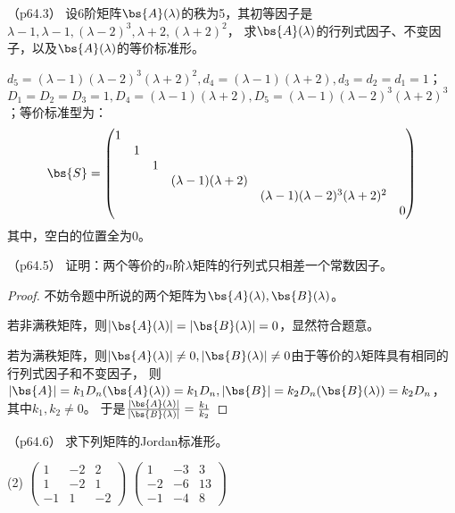 \documentclass[12pt, a4paper, oneside, UTF8]{ctexbook}
\begin{document}
\begin{question}（p64.3）
    设6阶矩阵$\bs{A}(\lambda)$的秩为5，其初等因子是$\lambda-1,\lambda-1,(\lambda-2)^3,\lambda+2,(\lambda+2)^2$，
    求$\bs{A}(\lambda)$的行列式因子、不变因子，以及$\bs{A}(\lambda)$的等价标准形。
\end{question}


\begin{solution}
    $d_5=(\lambda-1)(\lambda-2)^3(\lambda+2)^2,d_4=(\lambda-1)(\lambda+2),d_3=d_2=d_1=1$；
    $D_1=D_2=D_3=1,D_4=(\lambda-1)(\lambda+2),D_5=(\lambda-1)(\lambda-2)^3(\lambda+2)^3$；等价标准型为：
    \begin{align*}
        \bs{S}=\begin{pmatrix}
            1 & & & & & \\
            & 1 & & & &\\
            & & 1 & & &\\
            & & & (\lambda-1)(\lambda+2) & &\\
            & & & & (\lambda-1)(\lambda-2)^3(\lambda+2)^2 &\\
            & & & & & 0 \\
        \end{pmatrix}
    \end{align*}
    其中，空白的位置全为0。
\end{solution}

\begin{question}（p64.5）
    证明：两个等价的$n$阶$\lambda$矩阵的行列式只相差一个常数因子。
\end{question}

\begin{proof}
    不妨令题中所说的两个矩阵为$\bs{A}(\lambda),\bs{B}(\lambda)$。

    若非满秩矩阵，则$|\bs{A}(\lambda)|=|\bs{B}(\lambda)|=0$，显然符合题意。

    若为满秩矩阵，则$|\bs{A}(\lambda)| \neq 0,|\bs{B}(\lambda)| \neq 0$由于等价的$\lambda$矩阵具有相同的行列式因子和不变因子，
    则$|\bs{A}|=k_1D_n(\bs{A}(\lambda))=k_1D_n,|\bs{B}|=k_2D_n(\bs{B}(\lambda))=k_2D_n$，其中$k_1,k_2 \neq 0$。
    于是$\frac{|\bs{A}(\lambda)|}{|\bs{B}(\lambda)|}=\frac{k_1}{k_2}$
\end{proof}

\begin{question}（p64.6）
    求下列矩阵的Jordan标准形。
    \begin{tasks}[label=(\arabic*)](2)
        \task $\begin{pmatrix}
            1 & -2 & 2 \\
            1 & -2 & 1\\
            -1 & 1& -2
        \end{pmatrix}$
        \task $\begin{pmatrix}
            1 & -3 & 3 \\
            -2 & -6 & 13\\
            -1 & -4& 8
        \end{pmatrix}$
    \end{tasks}
\end{question}
\end{document}
